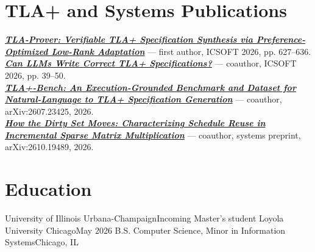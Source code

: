 \documentclass[letterpaper,11pt]{article}
\begin{document}
\section*{TLA+ and Systems Publications}
\begin{itemize}[leftmargin=0.15in, label={}]
  \small{\item{
    \href{https://doi.org/10.5220/0015234600004088}{\textbf{\emph{TLA-Prover: Verifiable TLA+ Specification Synthesis via Preference-Optimized Low-Rank Adaptation}}} --- first author, ICSOFT 2026, pp. 627--636. \\
    \href{https://doi.org/10.5220/0015070400004088}{\textbf{\emph{Can LLMs Write Correct TLA+ Specifications?}}} --- coauthor, ICSOFT 2026, pp. 39--50. \\
    \href{https://arxiv.org/abs/2607.23425}{\textbf{\emph{TLA+-Bench: An Execution-Grounded Benchmark and Dataset for Natural-Language to TLA+ Specification Generation}}} --- coauthor, arXiv:2607.23425, 2026. \\
    \href{https://arxiv.org/abs/2610.19489}{\textbf{\emph{How the Dirty Set Moves: Characterizing Schedule Reuse in Incremental Sparse Matrix Multiplication}}} --- coauthor, systems preprint, arXiv:2610.19489, 2026.
  }}
\end{itemize}

\section*{Education}
\resumeSubHeadingListStart
  \resumeSubheading
    {University of Illinois Urbana-Champaign}{Incoming}
    {Master's student}{}
  \resumeSubheading
    {Loyola University Chicago}{May 2026}
    {B.S. Computer Science, Minor in Information Systems}{Chicago, IL}
    \resumeItemListStart
    \resumeItemListEnd
\resumeSubHeadingListEnd
\end{document}
